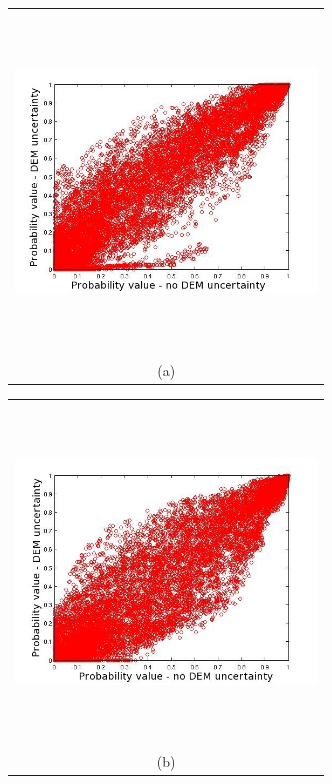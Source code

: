 \documentclass[12pt]{article}
\newcommand{\Pic}[2][0.85]{\begin{center}\texttt{[image: \#2]}
 \end{center} }
\begin{document}
\begin{figure}[H]
      \begin{minipage}[b]{0.6\textwidth}
        \begin{tabular}{c}
       \includegraphics[width=8cm,height=9cm,keepaspectratio]{Galeras_Aster_vs_meth0.jpg}\\
        (a)
        \end{tabular}
    \end{minipage}
    \begin{minipage}{0.6\textwidth}
        \begin{tabular}{c}
	\includegraphics[width=8cm,height=9cm,keepaspectratio]{Galeras_Aster_vs_meth3.jpg}\\
        (b)

\end{tabular}
\end{minipage}
\end{figure}
\end{document}

